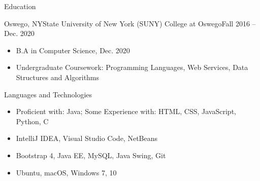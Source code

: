 \documentclass[]{johnsoncv}
\begin{document}
	\makeheader
	
	
	\begin{cvsection}{Education}
		\begin{cvsubsection}{Oswego, NY}{State University of New York (SUNY) College at Oswego}{Fall 2016 – Dec. 2020}
			\begin{itemize}
				\item B.A in Computer Science, Dec. 2020
				\item Undergraduate Coursework: Programming Languages, Web Services, Data Structures and Algorithms
			\end{itemize}
		\end{cvsubsection}
	\end{cvsection}

	\begin{cvsection}{Languages and Technologies}
		\begin{cvsubsection}{}{}{}	
			\begin{itemize}
				\item Proficient with: Java; Some Experience with: HTML, CSS, JavaScript, Python, C
				\item IntelliJ IDEA, Visual Studio Code, NetBeans
				\item Bootstrap 4, Java EE, MySQL, Java Swing, Git
				\item Ubuntu, macOS, Windows 7, 10
			\end{itemize}
		\end{cvsubsection}
	\end{cvsection}

\end{document}
